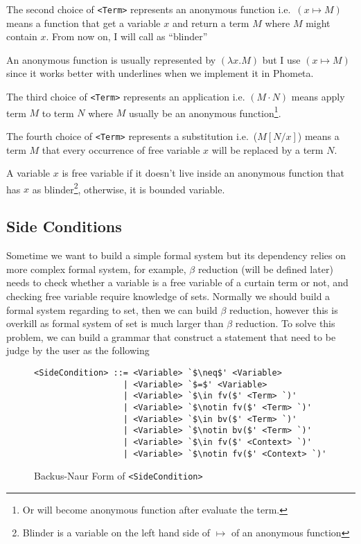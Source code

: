 \documentclass[master.tex]{subfiles}
\begin{document}
The second choice of \texttt{<Term>} represents an anonymous function i.e.\ $(x
\mapsto M)$ means a function that get a variable $x$ and return a term $M$ where
$M$ might contain $x$. From now on, I will call  as ``blinder''

An anonymous function is usually represented by $(\lambda x . M)$ but I use $(x
\mapsto M)$ since it works better with underlines when we implement it in
Phometa.

The third choice of \texttt{<Term>} represents an application i.e. $(M \cdot
N)$ means apply term $M$ to term $N$ where $M$ usually be an anonymous
function\footnote{Or will become anonymous function after evaluate the term.}.

The fourth choice of \texttt{<Term>} represents a substitution i.e.\ ($M [ N / x
]$) means a term $M$ that every occurrence of free variable $x$ will be replaced
by a term $N$.

A variable $x$ is free variable if it doesn't live inside an anonymous function
that has $x$ as blinder\footnote{Blinder is a variable on the left hand side
of $\mapsto$ of an anonymous function}, otherwise, it is bounded variable.

\subsection{Side Conditions}

Sometime we want to build a simple formal system but its dependency relies on
more complex formal system, for example, $\beta$ reduction (will be defined
later) needs to check whether a variable is a free variable of a curtain term or
not, and checking free variable require knowledge of sets. Normally we should
build a formal system regarding to set, then we can build $\beta$ reduction,
however this is overkill as formal system of set is much larger than $\beta$
reduction. To solve this problem, we can build a grammar that construct a
statement that need to be judge by the user as the following

\begin{figure}[H]
\begin{framed}
\begin{lstlisting}[style=bnf]
<SideCondition> ::= <Variable> `$\neq$' <Variable>
                  | <Variable> `$=$' <Variable>
                  | <Variable> `$\in fv($' <Term> `)'
                  | <Variable> `$\notin fv($' <Term> `)'
                  | <Variable> `$\in bv($' <Term> `)'
                  | <Variable> `$\notin bv($' <Term> `)'
                  | <Variable> `$\in fv($' <Context> `)'
                  | <Variable> `$\notin fv($' <Context> `)'
\end{lstlisting}
\end{framed}
\caption{Backus-Naur Form of \texttt{<SideCondition>}}
\end{figure}
\end{document}
